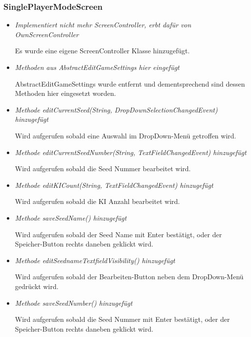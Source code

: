 \subsubsection{SinglePlayerModeScreen}
\begin{itemize}
    \item \textit{Implementiert nicht mehr ScreenController, erbt dafür von OwnScreenController}
        \begin{leftbar}[0.9\linewidth]
            Es wurde eine eigene ScreenController Klasse hinzugefügt.
        \end{leftbar}
    \pagebreak
    \item \textit{Methoden aus AbstractEditGameSettings hier eingefügt}
        \begin{leftbar}[0.9\linewidth]
            AbstractEditGameSettings wurde entfernt und dementsprechend sind dessen Methoden 
            hier eingesetzt worden.
        \end{leftbar}
    \item \textit{Methode editCurrentSeed(String, DropDownSelectionChangedEvent) hinzugefügt}
        \begin{leftbar}[0.9\linewidth]
            Wird aufgerufen sobald eine Auswahl im DropDown-Menü getroffen wird.
        \end{leftbar}
    \item \textit{Methode editCurrentSeedNumber(String, TextFieldChangedEvent) hinzugefügt}
        \begin{leftbar}[0.9\linewidth]
            Wird aufgerufen sobald die Seed Nummer bearbeitet wird.
        \end{leftbar}
    \item \textit{Methode editKICount(String, TextFieldChangedEvent) hinzugefügt}
        \begin{leftbar}[0.9\linewidth]
            Wird aufgerufen sobald die KI Anzahl bearbeitet wird.
        \end{leftbar}
    \item \textit{Methode saveSeedName() hinzugefügt}
        \begin{leftbar}[0.9\linewidth]
            Wird aufgerufen sobald der Seed Name mit Enter bestätigt, oder der Speicher-Button
            rechts daneben geklickt wird.
        \end{leftbar}
    \item \textit{Methode editSeednameTextfieldVisibility() hinzugefügt}
        \begin{leftbar}[0.9\linewidth]
            Wird aufgerufen sobald der Bearbeiten-Button neben dem DropDown-Menü gedrückt wird.
        \end{leftbar}
    \item \textit{Methode saveSeedNumber() hinzugefügt}
        \begin{leftbar}[0.9\linewidth]
            Wird aufgerufen sobald die Seed Nummer mit Enter bestätigt, oder der Speicher-Button
            rechts daneben geklickt wird.
        \end{leftbar}
\end{itemize}

